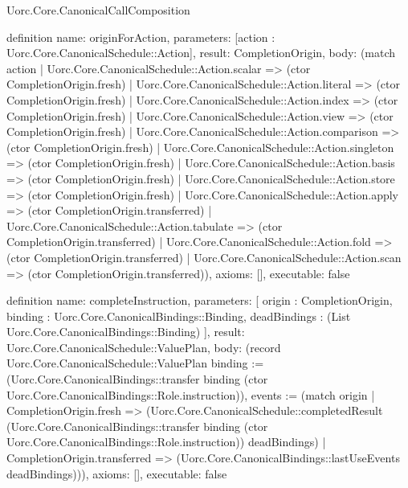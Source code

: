\begin{lexlean}{Uorc.Core.CanonicalCallComposition}
\begin{semanticmodule}
definition{
  name: originForAction,
  parameters: [action : Uorc.Core.CanonicalSchedule::Action],
  result: CompletionOrigin,
  body: (match action
    | Uorc.Core.CanonicalSchedule::Action.scalar => (ctor CompletionOrigin.fresh)
    | Uorc.Core.CanonicalSchedule::Action.literal => (ctor CompletionOrigin.fresh)
    | Uorc.Core.CanonicalSchedule::Action.index => (ctor CompletionOrigin.fresh)
    | Uorc.Core.CanonicalSchedule::Action.view => (ctor CompletionOrigin.fresh)
    | Uorc.Core.CanonicalSchedule::Action.comparison => (ctor CompletionOrigin.fresh)
    | Uorc.Core.CanonicalSchedule::Action.singleton => (ctor CompletionOrigin.fresh)
    | Uorc.Core.CanonicalSchedule::Action.basis => (ctor CompletionOrigin.fresh)
    | Uorc.Core.CanonicalSchedule::Action.store => (ctor CompletionOrigin.fresh)
    | Uorc.Core.CanonicalSchedule::Action.apply => (ctor CompletionOrigin.transferred)
    | Uorc.Core.CanonicalSchedule::Action.tabulate => (ctor CompletionOrigin.transferred)
    | Uorc.Core.CanonicalSchedule::Action.fold => (ctor CompletionOrigin.transferred)
    | Uorc.Core.CanonicalSchedule::Action.scan => (ctor CompletionOrigin.transferred)),
  axioms: [],
  executable: false
}

definition{
  name: completeInstruction,
  parameters: [
    origin : CompletionOrigin,
    binding : Uorc.Core.CanonicalBindings::Binding,
    deadBindings : (List Uorc.Core.CanonicalBindings::Binding)
  ],
  result: Uorc.Core.CanonicalSchedule::ValuePlan,
  body: (record Uorc.Core.CanonicalSchedule::ValuePlan {binding := (Uorc.Core.CanonicalBindings::transfer binding (ctor Uorc.Core.CanonicalBindings::Role.instruction)), events := (match origin
    | CompletionOrigin.fresh => (Uorc.Core.CanonicalSchedule::completedResult (Uorc.Core.CanonicalBindings::transfer binding (ctor Uorc.Core.CanonicalBindings::Role.instruction)) deadBindings)
    | CompletionOrigin.transferred => (Uorc.Core.CanonicalBindings::lastUseEvents deadBindings))}),
  axioms: [],
  executable: false
}
\end{semanticmodule}
\end{lexlean}
